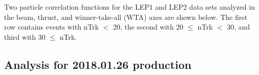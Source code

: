 Two particle correlation functions for the LEP1 and LEP2 data sets analyzed in the beam, thrust, and winner-take-all (WTA) axes are shown below. The first row contains events with nTrk $<$ 20, the second with 20 $\leq$ nTrk $<$ 30, and third with 30 $\leq$ nTrk.



\subsection{Analysis for 2018.01.26 production}


